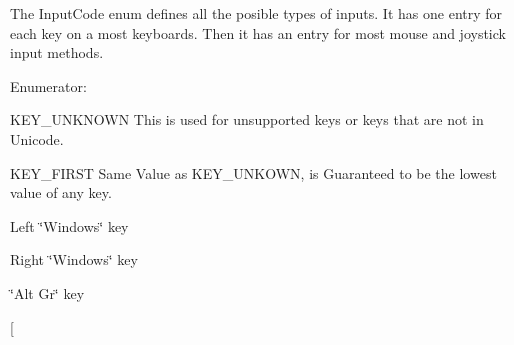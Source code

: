 The InputCode enum defines all the posible types of inputs. It has one entry for each key on a most keyboards. Then it has an entry for most mouse and joystick input methods. \begin{Desc}
\item[Enumerator: ]\par
\begin{description}
\item[{\em 
\hypertarget{classMetaCode_a7390e6f58e25c0ce377bba4e63081b24af7c19e29f8e1299858f9a9a0e2e0df32}{
KEY\_\-FIRST}
\label{d7/d72/classMetaCode_a7390e6f58e25c0ce377bba4e63081b24af7c19e29f8e1299858f9a9a0e2e0df32}
}]KEY\_\-UNKNOWN This is used for unsupported keys or keys that are not in Unicode. \item[{\em 
\hypertarget{classMetaCode_a7390e6f58e25c0ce377bba4e63081b24a11be427f22c538fc5682e0b7fa3e1e6d}{
KEY\_\-BACKSPACE}
\label{d7/d72/classMetaCode_a7390e6f58e25c0ce377bba4e63081b24a11be427f22c538fc5682e0b7fa3e1e6d}
}]KEY\_\-FIRST Same Value as KEY\_\-UNKOWN, is Guaranteed to be the lowest value of any key. \item[{\em 
\hypertarget{classMetaCode_a7390e6f58e25c0ce377bba4e63081b24a6404942e1d26f745d17c7a508c0ffa55}{
KEY\_\-LSUPER}
\label{d7/d72/classMetaCode_a7390e6f58e25c0ce377bba4e63081b24a6404942e1d26f745d17c7a508c0ffa55}
}]Left \char`\"{}Windows\char`\"{} key \item[{\em 
\hypertarget{classMetaCode_a7390e6f58e25c0ce377bba4e63081b24a729875d449534841cde46b53777f7753}{
KEY\_\-RSUPER}
\label{d7/d72/classMetaCode_a7390e6f58e25c0ce377bba4e63081b24a729875d449534841cde46b53777f7753}
}]Right \char`\"{}Windows\char`\"{} key \item[{\em 
\hypertarget{classMetaCode_a7390e6f58e25c0ce377bba4e63081b24a79956c29fd4e16e82532643471b79aaa}{
KEY\_\-MODE}
\label{d7/d72/classMetaCode_a7390e6f58e25c0ce377bba4e63081b24a79956c29fd4e16e82532643471b79aaa}
}]\char`\"{}Alt Gr\char`\"{} key \item[{\em 
}
\end{description}
\end{Desc}

